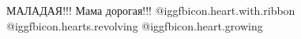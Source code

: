  
 
 
 
 


МАЛАДАЯ!!! Мама дорогая!!! @igg{fbicon.heart.with.ribbon}
@igg{fbicon.hearts.revolving}  @igg{fbicon.heart.growing} 
